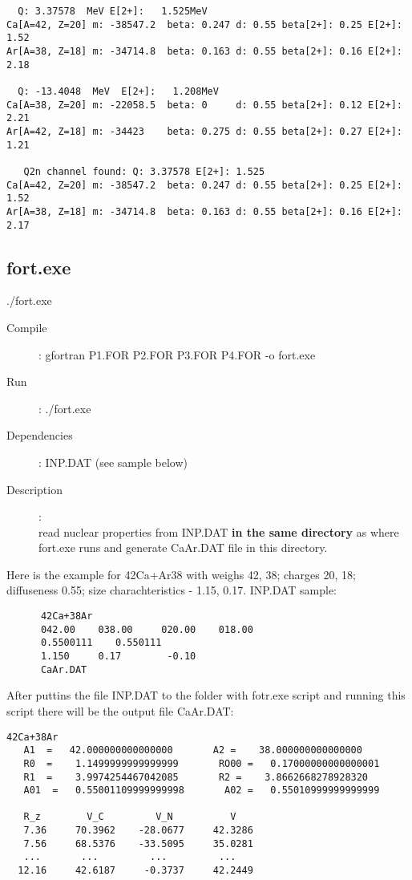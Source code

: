 \documentclass[preprint,review,12pt]{elsarticle}
\begin{document}
\begin{description}
\begin{verbatim}
  Q: 3.37578  MeV E[2+]:   1.525MeV
Ca[A=42, Z=20] m: -38547.2  beta: 0.247 d: 0.55 beta[2+]: 0.25 E[2+]: 1.52
Ar[A=38, Z=18] m: -34714.8  beta: 0.163 d: 0.55 beta[2+]: 0.16 E[2+]: 2.18
   
  Q: -13.4048  MeV  E[2+]:   1.208MeV
Ca[A=38, Z=20] m: -22058.5  beta: 0     d: 0.55 beta[2+]: 0.12 E[2+]: 2.21
Ar[A=42, Z=18] m: -34423    beta: 0.275 d: 0.55 beta[2+]: 0.27 E[2+]: 1.21
   
   Q2n channel found: Q: 3.37578 E[2+]: 1.525
Ca[A=42, Z=20] m: -38547.2  beta: 0.247 d: 0.55 beta[2+]: 0.25 E[2+]: 1.52
Ar[A=38, Z=18] m: -34714.8  beta: 0.163 d: 0.55 beta[2+]: 0.16 E[2+]: 2.17

    \end{verbatim}  
    \end{description}


  \subsection{fort.exe}
  \label{sec:fort}
    ./fort.exe    %
    \begin{description}
       \item[Compile]:  gfortran P1.FOR P2.FOR P3.FOR P4.FOR -o fort.exe
       \item[Run]: ./fort.exe
       
       \item [Dependencies]:
           \subitem   INP.DAT (see sample below)

       \item [Description]: \\
           read nuclear properties from INP.DAT \textbf{in the same directory} as where fort.exe runs and generate CaAr.DAT file in this directory.
           
    \end{description}
       Here is the example for 42Ca+Ar38 with weighs 42, 38; charges 20, 18; diffuseness 0.55; size charachteristics - 1.15, 0.17.
      INP.DAT sample:
    \begin{verbatim}
      42Ca+38Ar
      042.00    038.00     020.00    018.00
      0.5500111    0.550111
      1.150     0.17        -0.10
      CaAr.DAT
    \end{verbatim}  
    After puttins the file INP.DAT to the folder with fotr.exe script and running this script there will be the output file CaAr.DAT:
    \begin{verbatim}
42Ca+38Ar                                                                       
   A1  =   42.000000000000000       A2 =    38.000000000000000     
   R0  =    1.1499999999999999       RO00 =   0.17000000000000001     
   R1  =    3.9974254467042085       R2 =    3.8662668278928320     
   A01  =   0.55001109999999998       A02 =   0.55010999999999999     

   R_z        V_C         V_N          V
   7.36     70.3962    -28.0677     42.3286
   7.56     68.5376    -33.5095     35.0281
   ...       ...         ...         ...
  12.16     42.6187     -0.3737     42.2449
    \end{verbatim}  
\end{document}
